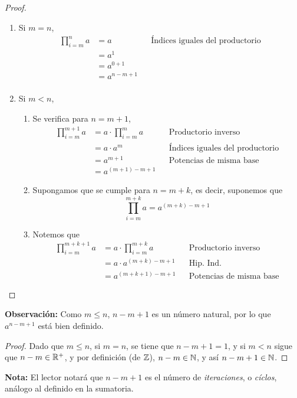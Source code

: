 \begin{proof}\leavevmode
  \begin{enumerate}[label=\Roman*)]
    \item Si $m=n$, 
    \begin{align*}
      \prod_{i=m}^{n} a &= a && \text{Índices iguales del productorio}\\
      &= a^1\\
      &= a^{0+1}\\
      &= a^{n-m+1}\\
    \end{align*}
    \item Si $m<n$,
    \begin{enumerate}[label=\roman*)]
      \item Se verifica para $n=m+1$,
      \begin{align*}
        \prod_{i=m}^{m+1} a &= a\cdot \prod_{i=m}^{m} a && \text{Productorio inverso}\\
        &= a \cdot a^m && \text{Índices iguales del productorio}\\
        &= a^{m+1} && \text{Potencias de misma base}\\
        &= a^{(m+1)-m+1}
      \end{align*}
      \item Supongamos que se cumple para $n=m+k$, es decir, suponemos que \[\prod_{i=m}^{m+k} a = a^{(m+k)-m+1}\]
      \item Notemos que
      \begin{align*}
        \prod_{i=m}^{m+k+1} a &= a\cdot \prod_{i=m}^{m+k} a && \text{Productorio inverso}\\
        &= a\cdot a^{(m+k)-m+1} && \text{Hip. Ind.}\\
        &= a^{(m+k+1)-m+1} && \text{Potencias de misma base}
      \end{align*}
    \end{enumerate}
  \end{enumerate}
\end{proof}

\textbf{Observación:} Como $m\leq n$, $n-m+1$ es un número natural, por lo que $a^{n-m+1}$ está bien definido.
\begin{proof}\leavevmode
  Dado que $m\leq n$, si $m=n$, se tiene que $n-m+1=1$, y si $m<n$ sigue que $n-m\in \mathbb{R}^+$, y por definición (de $\mathbb{Z}$), $n-m\in \mathbb{N}$, y así $n-m+1\in \mathbb{N}$.
\end{proof}

\textbf{Nota:} El lector notará que $n-m+1$ es el número de \textit{iteraciones}, o \textit{cíclos}, análogo al definido en la sumatoria.

